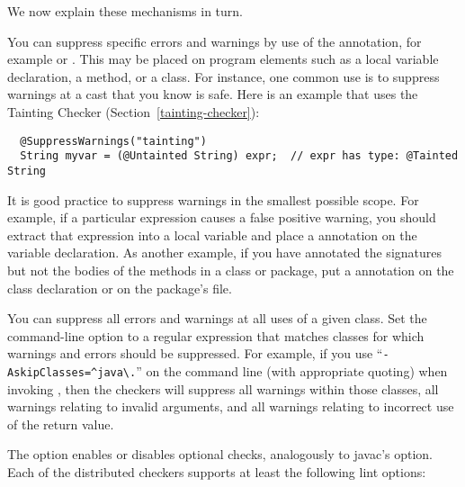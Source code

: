 \noindent
We now explain these mechanisms in turn.

You can suppress specific errors and warnings by use of the
 annotation, for example
 or .
This may be placed on program elements such as a local
variable declaration, a method, or a class.  For instance, one common use is
to suppress warnings at a cast that you know is safe.  Here is an example
that uses the Tainting Checker (Section~\ref{tainting-checker}):

\begin{Verbatim}
  @SuppressWarnings("tainting")
  String myvar = (@Untainted String) expr;  // expr has type: @Tainted String
\end{Verbatim}

It is good practice to suppress warnings in the
smallest possible scope.  For example, if a particular expression causes a
false positive warning, you should extract that expression into a local variable
and place a  annotation on the variable
declaration.
As another example, if you have annotated the signatures but not the bodies
of the methods in a class or package, put a 
annotation on the class declaration or on the package's
 file.

You can suppress all errors and warnings at all uses of a given class.
Set the  command-line option to a
regular expression that matches classes for which warnings and errors
should be suppressed.  For example, if you use
``{\codesize\verb|-AskipClasses=^java\.|}'' on the command line
(with appropriate quoting) when invoking
, then the checkers will suppress all warnings within those
classes, all warnings relating to invalid arguments, and all warnings
relating to incorrect use of the return value.


\label{lint-options}

The  option enables or disables optional checks, analogously to 
javac's  option.
Each of the distributed checkers supports at least the following lint options:

